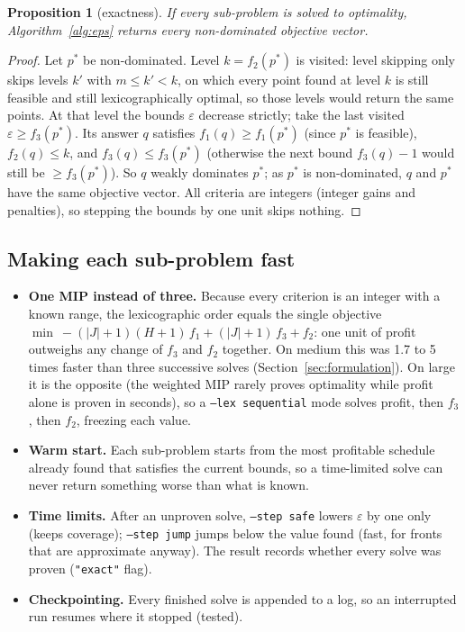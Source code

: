 \documentclass[11pt,a4paper]{article}
\theoremstyle{plain}
\newtheorem{proposition}{Proposition}
\newcommand{\eps}{\varepsilon}
\begin{document}
\begin{proposition}[exactness]\label{prop:exact}
If every sub-problem is solved to optimality, Algorithm~\ref{alg:eps} returns every non-dominated objective vector.
\end{proposition}

\begin{proof}
Let $p^*$ be non-dominated. Level $k=f_2(p^*)$ is visited: level skipping only skips levels $k'$ with $m\le k'<k$, on which every point found at level $k$ is still feasible and still lexicographically optimal, so those levels would return the same points. At that level the bounds $\eps$ decrease strictly; take the last visited $\eps\ge f_3(p^*)$. Its answer $q$ satisfies $f_1(q)\ge f_1(p^*)$ (since $p^*$ is feasible), $f_2(q)\le k$, and $f_3(q)\le f_3(p^*)$ (otherwise the next bound $f_3(q)-1$ would still be $\ge f_3(p^*)$). So $q$ weakly dominates $p^*$; as $p^*$ is non-dominated, $q$ and $p^*$ have the same objective vector. All criteria are integers (integer gains and penalties), so stepping the bounds by one unit skips nothing.
\end{proof}

\subsection{Making each sub-problem fast}

\begin{itemize}
  \item \textbf{One MIP instead of three.} Because every criterion is an integer with a known range, the lexicographic order equals the single objective $\min\ -(|J|+1)(H+1)\,f_1+(|J|+1)\,f_3+f_2$: one unit of profit outweighs any change of $f_3$ and $f_2$ together. On medium this was 1.7 to 5 times faster than three successive solves (Section~\ref{sec:formulation}). On large it is the opposite (the weighted MIP rarely proves optimality while profit alone is proven in seconds), so a \texttt{--lex sequential} mode solves profit, then $f_3$, then $f_2$, freezing each value.
  \item \textbf{Warm start.} Each sub-problem starts from the most profitable schedule already found that satisfies the current bounds, so a time-limited solve can never return something worse than what is known.
  \item \textbf{Time limits.} After an unproven solve, \texttt{--step safe} lowers $\eps$ by one only (keeps coverage); \texttt{--step jump} jumps below the value found (fast, for fronts that are approximate anyway). The result records whether every solve was proven (\texttt{"exact"} flag).
  \item \textbf{Checkpointing.} Every finished solve is appended to a log, so an interrupted run resumes where it stopped (tested).
\end{itemize}
\end{document}
